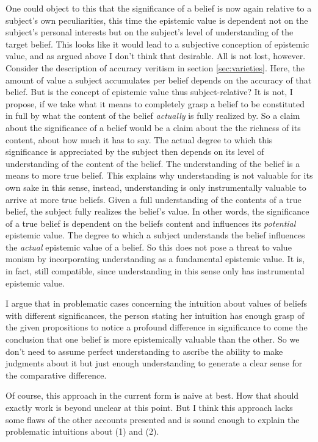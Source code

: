 \documentclass[12pt,numbers=noenddot]{scrartcl}
\begin{document}
One could object to this that the significance of a belief is now again relative to a subject's own peculiarities, this time the epistemic value is dependent not on the subject's personal interests but on the subject's level of understanding of the target belief. This looks like it would lead to a subjective conception of epistemic value, and as argued above I don't think that desirable. All is not lost, however. Consider the description of accuracy veritism in section \ref{sec:varieties}. Here, the amount of value a subject accumulates per belief depends on the accuracy of that belief. But is the concept of epistemic value thus subject-relative? It is not, I propose, if we take what it means to completely grasp a belief to be constituted in full by what the content of the belief \emph{actually} is fully realized by. So a claim about the significance of a belief would be a claim about the the richness of its content, about how much it has to say. The actual degree to which this significance is appreciated by the subject then depends on its level of understanding of the content of the belief. The understanding of the belief is a means to more true belief. This explains why understanding is not valuable for its own sake in this sense, instead, understanding is only instrumentally valuable to arrive at more true beliefs. Given a full understanding of the contents of a true belief, the subject fully realizes the belief's value. In other words, the significance of a true belief is dependent on the beliefs content and influences its \emph{potential} epistemic value. The degree to which a subject understands the belief influences the \emph{actual} epistemic value of a belief. So this does not pose a threat to value monism by incorporating understanding as a fundamental epistemic value. It is, in fact, still compatible, since understanding in this sense only has instrumental epistemic value.

I argue that in problematic cases concerning the intuition about values of beliefs with different significances, the person stating her intuition has enough grasp of the given propositions to notice a profound difference in significance to come the conclusion that one belief is more epistemically valuable than the other. So we don't need to assume perfect understanding to ascribe the ability to make judgments about it but just enough understanding to generate a clear sense for the comparative difference.

Of course, this approach in the current form is naive at best. How that should exactly work is beyond unclear at this point. But I think this approach lacks some flaws of the other accounts presented and is sound enough to explain the problematic intuitions about (1) and (2).
\end{document}

